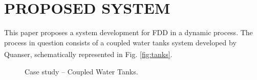 \documentclass[10pt,fleqn,a4paper]{article}
\newcommand{\reg}{\textsuperscript{\textregistered}}
\begin{document}
\section{PROPOSED SYSTEM}\label{sec:proposed}
This paper proposes a system development for FDD in a dynamic process. The
process in question consists of a coupled water tanks system developed by
Quanser\reg, schematically represented in Fig.  \ref{fig:tanks}.

\begin{figure}[htb]
\centering
{}
\qquad
{}
    \caption{Case study -- Coupled Water Tanks.}
\end{figure}
\end{document}
